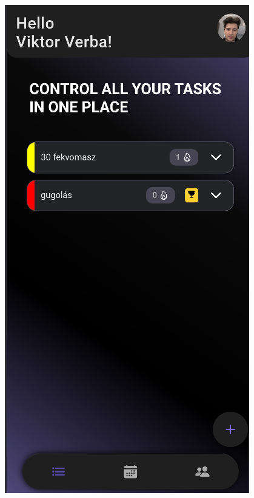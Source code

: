 \documentclass[12pt]{report}
\begin{document}
\begin{figure}[H]
\begin{minipage}[b]{0.25\textwidth}
        \includegraphics[width=\linewidth]{src/challenge5.png}
    \end{minipage}
\end{figure}

\newpage
\end{document}
